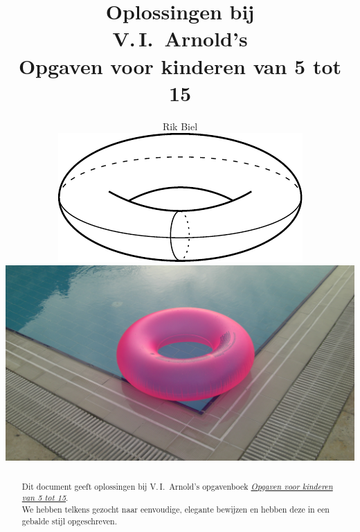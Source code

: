 
\usepackage{soul}
\setdefaultlanguage{dutch}
\DeclareSIUnit[number-unit-product=\,]
\renewcommand{\leq}{\leqslant}
\renewcommand{\geq}{\geqslant}

\title{Oplossingen bij\\V.\,I.~Arnold's\\Opgaven voor kinderen van 5 tot 15}
\author{Rik Biel
\vspace*{1.5cm}\\
\includegraphics[scale=0.43]{resources/74_torus}
\vspace*{0.5cm}\\
\includegraphics[scale=0.05]{resources/zwemband}
}
\date{}



\maketitle
\thispagestyle{empty}
\cleardoublepage
\setcounter{page}{1}

\begin{abstract}
Dit document geeft oplossingen bij V.\,I.~Arnold's opgavenboek \href{https://www.imaginary.org/sites/default/files/5to15_nl_nl_0.pdf}{\textit{Opgaven voor kinderen van 5 tot 15}}.\\

\noindent We hebben telkens gezocht naar eenvoudige, elegante bewijzen en hebben deze in een gebalde stijl opgeschreven.
\end{abstract}

